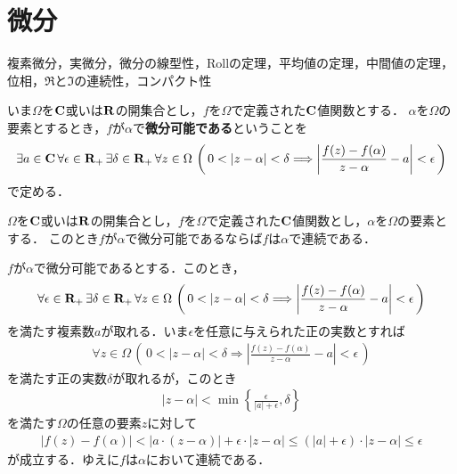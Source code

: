 \section{微分}
	複素微分，実微分，微分の線型性，Rollの定理，平均値の定理，中間値の定理，
	位相，$\Re$と$\Im$の連続性，コンパクト性
	
	いま$\Omega$を$\mathbf{C}$或いは$\mathbf{R}$の開集合とし，$f$を$\Omega$で定義された$\mathbf{C}$値関数とする．
	$\alpha$を$\Omega$の要素とするとき，$f$が$\alpha$で{\bf 微分可能である}ということを
	\begin{align}
		\exists a \in \mathbf{C}\, \forall \epsilon \in \mathbf{R}_+\, \exists \delta \in \mathbf{R}_+\,
		\forall z \in \Omega\, 
		\left(\, 0 < |z - \alpha| < \delta \Longrightarrow 
		\left| \frac{f(z) - f(\alpha)}{z-\alpha} - a\right| < \epsilon\, \right)
	\end{align}
	で定める．
	
	\begin{screen}
		\begin{thm}[微分可能なら連続]
			$\Omega$を$\mathbf{C}$或いは$\mathbf{R}$の開集合とし，$f$を$\Omega$で定義された$\mathbf{C}$値関数とし，$\alpha$を$\Omega$の要素とする．
			このとき$f$が$\alpha$で微分可能であるならば$f$は$\alpha$で連続である．
		\end{thm}
	\end{screen}
	
	\begin{sketch}
		$f$が$\alpha$で微分可能であるとする．このとき，
		\begin{align}
			\forall \epsilon \in \mathbf{R}_+\, \exists \delta \in \mathbf{R}_+\,
			\forall z \in \Omega\, 
			\left(\, 0 < |z - \alpha| < \delta \Longrightarrow 
			\left| \frac{f(z) - f(\alpha)}{z-\alpha} - a\right| < \epsilon\, \right)
		\end{align}
		を満たす複素数$a$が取れる．いま$\epsilon$を任意に与えられた正の実数とすれば
		\begin{align}
			\forall z \in \Omega\, 
			\left(\, 0 < |z - \alpha| < \delta \Longrightarrow 
			\left| \frac{f(z) - f(\alpha)}{z-\alpha} - a\right| < \epsilon\, \right)
		\end{align}
		を満たす正の実数$\delta$が取れるが，このとき
		\begin{align}
			|z - \alpha| < \min\left\{\frac{\epsilon}{|a| + \epsilon}, \delta\right\}
		\end{align}
		を満たす$\Omega$の任意の要素$z$に対して
		\begin{align}
			|f(z) - f(\alpha)| < |a \cdot (z-\alpha)| + \epsilon \cdot |z-\alpha|
			\leq (|a| + \epsilon) \cdot |z-\alpha|
			\leq \epsilon
		\end{align}
		が成立する．ゆえに$f$は$\alpha$において連続である．
		\QED
	\end{sketch}
	
